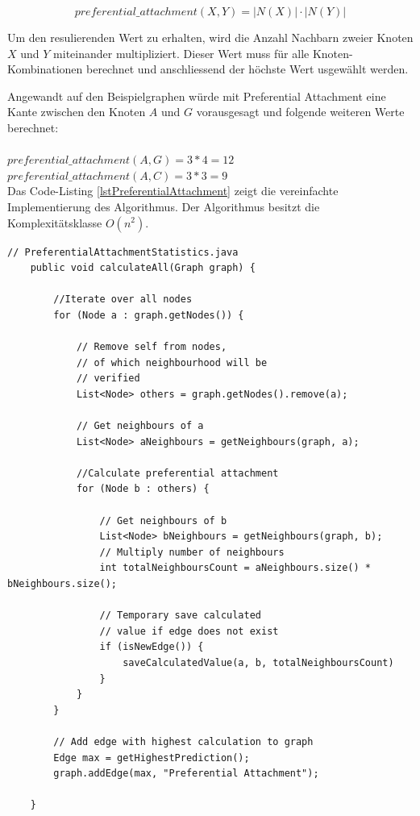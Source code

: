 \begin{equation}
    \label{eq:pa}
    preferential\_attachment(X,Y) = | N(X) | \cdot | N(Y ) |
\end{equation}

Um den resulierenden Wert zu erhalten, wird die Anzahl Nachbarn zweier Knoten $X$ und $Y$ miteinander multipliziert.
Dieser Wert muss für alle Knoten-Kombinationen berechnet und anschliessend der höchste Wert usgewählt werden.

Angewandt auf den Beispielgraphen würde mit Preferential Attachment eine Kante zwischen den Knoten $A$ und $G$ vorausgesagt und folgende weiteren Werte berechnet:\\
\\
\vspace{4mm}
\forceindent $preferential\_attachment(A,G) = 3 * 4 = 12$\\
\vspace{4mm}
\forceindent $preferential\_attachment(A,C) = 3 * 3 = 9$\\

Das Code-Listing \ref{lstPreferentialAttachment} zeigt die vereinfachte Implementierung des Algorithmus. Der Algorithmus besitzt die Komplexitätsklasse $O(n^2)$.

\begin{lstlisting}[caption={Preferential attachment implementation},label=lstPreferentialAttachment]
    // PreferentialAttachmentStatistics.java
    public void calculateAll(Graph graph) {

        //Iterate over all nodes
        for (Node a : graph.getNodes()) {

            // Remove self from nodes,
            // of which neighbourhood will be
            // verified
            List<Node> others = graph.getNodes().remove(a);

            // Get neighbours of a
            List<Node> aNeighbours = getNeighbours(graph, a);

            //Calculate preferential attachment
            for (Node b : others) {

                // Get neighbours of b
                List<Node> bNeighbours = getNeighbours(graph, b);
                // Multiply number of neighbours
                int totalNeighboursCount = aNeighbours.size() * bNeighbours.size();

                // Temporary save calculated
                // value if edge does not exist
                if (isNewEdge()) {
                    saveCalculatedValue(a, b, totalNeighboursCount)
                }
            }
        }

        // Add edge with highest calculation to graph
        Edge max = getHighestPrediction();
        graph.addEdge(max, "Preferential Attachment");

    }
\end{lstlisting}

